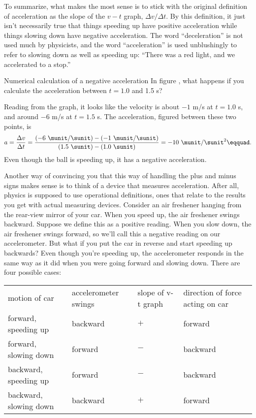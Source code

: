 To summarize, what makes the most sense is to stick with the
original definition of acceleration as the slope of the
$v-t$ graph, $\Delta v/\Delta t$. By this definition, it
just isn't necessarily true that things speeding up have
positive acceleration while things slowing down have
negative acceleration. The word ``deceleration'' is not used
much by physicists, and the word ``acceleration'' is used
unblushingly to refer to slowing down as well as speeding
up: ``There was a red light, and we accelerated to a stop.''

\begin{eg}{Numerical calculation of a negative acceleration}
\egquestion In figure , what happens if you
calculate the acceleration between $t=1.0$ and 1.5 s?

\eganswer Reading from the graph, it looks like the velocity
is about $-1$ m/s at $t=1.0$ s, and around $-6$ m/s at $t=1.5$ s.
The acceleration, figured between these two points, is
\begin{equation*}
  a = \frac{\Delta v}{\Delta t} = \frac{(-6\ \munit/\sunit)-(-1\ \munit/\sunit)}{(1.5\ \sunit)-(1.0\ \sunit)} = -10\ \munit/\sunit^2\eqquad.
\end{equation*}
Even though the ball is speeding up, it has a negative acceleration.
\end{eg}

Another way of convincing you that this way of handling the
plus and minus signs makes sense is to think of a device
that measures acceleration. After all, physics is supposed
to use operational definitions, ones that relate to the
results you get with actual measuring devices.
Consider an
air freshener hanging from the rear-view mirror of your car.
When you speed up, the air freshener swings backward.
Suppose we define this as a positive reading. When you slow
down, the air freshener swings forward, so we'll call this a
negative reading on our accelerometer. But what if you put
the car in reverse and start speeding up backwards? Even
though you're speeding up, the accelerometer responds in the
same way as it did when you were going forward and slowing
down. There are four possible cases:

\noindent\begin{tabular}{p{40mm}p{21mm}p{16mm}p{17mm}}
motion of car & accelerometer swings & slope of v-t graph & direction of force acting on car \\
forward, speeding up      & backward   & $+$   & forward \\
forward, slowing down     & forward    & $-$   & backward \\
backward, speeding up     & forward    & $-$   & backward \\
backward, slowing down    & backward   & $+$   & forward \\
\end{tabular}

